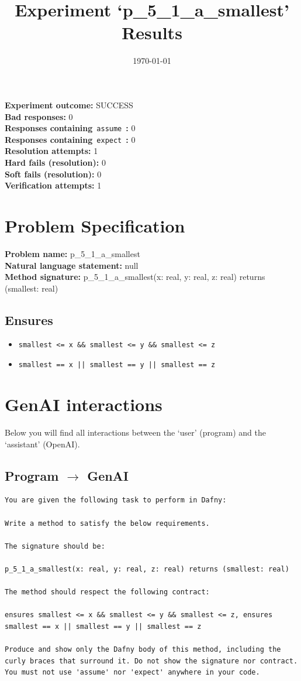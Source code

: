 \documentclass{article}
\begin{document}
\title{Experiment `p\_5\_1\_a\_smallest' Results}
\author{\today}
\date{}
\maketitle
\textbf{Experiment outcome: }SUCCESS
\\\textbf{Bad responses: }0
\\\textbf{Responses containing}~\texttt{assume}~\textbf{: }0
\\\textbf{Responses containing}~\texttt{expect}~\textbf{: }0
\\\textbf{Resolution attempts: }1
\\\textbf{Hard fails (resolution): }0
\\\textbf{Soft fails (resolution): }0
\\\textbf{Verification attempts: }1
\section*{Problem Specification}
\textbf{Problem name: }p\_5\_1\_a\_smallest
\\\textbf{Natural language statement: }null
\\\textbf{Method signature: }p\_5\_1\_a\_smallest(x: real, y: real, z: real) returns (smallest: real)
\subsection*{Ensures}
\begin{itemize}
\item \texttt{smallest <= x \&\& smallest <= y \&\& smallest <= z}
\item \texttt{smallest == x || smallest == y || smallest == z}
\end{itemize}
\clearpage
\section*{GenAI interactions}
Below you will find all interactions between the `user' (program) and the `assistant' (OpenAI).
\subsection*{Program $\rightarrow$ GenAI}
\begin{lstlisting}
You are given the following task to perform in Dafny:

Write a method to satisfy the below requirements.

The signature should be:

p_5_1_a_smallest(x: real, y: real, z: real) returns (smallest: real)

The method should respect the following contract:

ensures smallest <= x && smallest <= y && smallest <= z, ensures smallest == x || smallest == y || smallest == z

Produce and show only the Dafny body of this method, including the curly braces that surround it. Do not show the signature nor contract. You must not use 'assume' nor 'expect' anywhere in your code.
\end{lstlisting}
\end{document}
